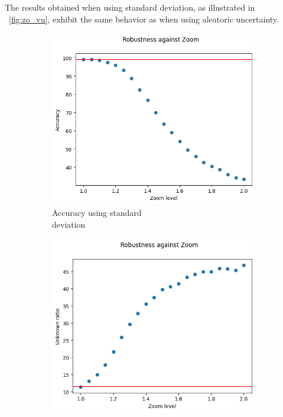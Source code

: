 The results obtained when using standard deviation, as illustrated in \Fig~\ref{fig:zo_vu}, exhibit the same behavior as when using aleatoric uncertainty.

\begin{figure}[h]
	\centering
	\begin{subfigure}{.33\textwidth}
		\centering
		\includegraphics[width=0.9\linewidth]{ImageFiles/EvalBNN/ZO/VU/acc}
		\caption{Accuracy using standard \\ deviation}
		\label{fig:zo_vu_acc}
	\end{subfigure}%
	\begin{subfigure}{.33\textwidth}
		\centering
		\includegraphics[width=0.9\linewidth]{ImageFiles/EvalBNN/ZO/VU/unkn}

\end{subfigure}
\end{figure}
